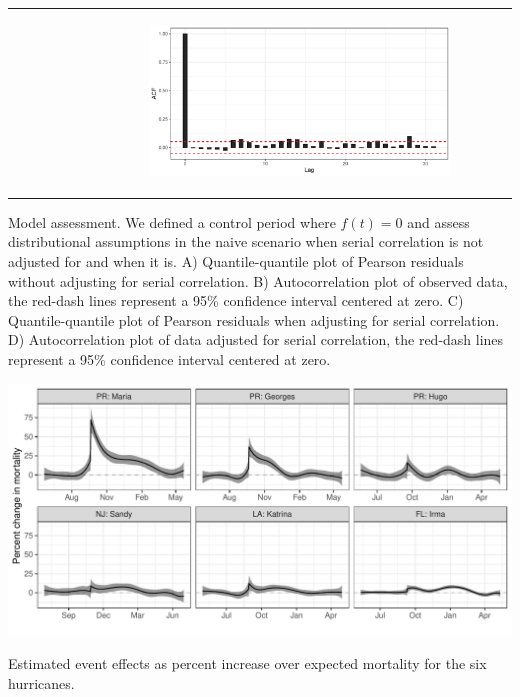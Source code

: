 \documentclass[11pt]{article}
\begin{document}
\begin{suppfigure}[ht]
\begin{tabular}{lll}
\begin{subfigure}[t]{0.49\linewidth}
	\end{subfigure}&
	\begin{subfigure}[t]{0.49\linewidth}
    	\centering
	    \includegraphics[width=1\linewidth]{figs/supp-figure-2d.pdf}
    \end{subfigure}\\
    \end{tabular}
    \caption{Model assessment. We defined a control period where $f(t)=0$ and assess distributional assumptions in the naive scenario when serial correlation is not adjusted for and when it is. A) Quantile-quantile plot of Pearson residuals without adjusting for serial correlation. B) Autocorrelation plot of observed data, the red-dash lines represent a 95\% confidence interval centered at zero. C) Quantile-quantile plot of Pearson residuals when adjusting for serial correlation. D) Autocorrelation plot of data adjusted for serial correlation, the red-dash lines represent a 95\% confidence interval centered at zero.}
    \label{fig:correlated-errors}
\end{suppfigure}

\begin{suppfigure}[ht]
	\centering
	\includegraphics[width=1\linewidth]{figs/supp-figure-3.pdf} 
    \caption{Estimated event effects as percent increase over expected mortality for the six hurricanes.}
	\label{supp-fig:hurricane-effects}
\end{suppfigure}
\end{document}
